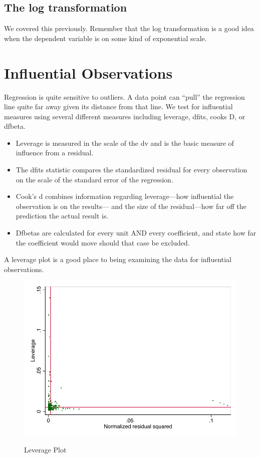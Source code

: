 \documentclass[12pt]{article}
\begin{document}
\subsection{The log transformation}
\label{sec:log-transformation}

We covered this previously. Remember that the log transformation is a
good idea when the dependent variable is on some kind of exponential
scale. 

\section{Influential Observations}
\label{sec:infl-observ}

Regression is quite sensitive to outliers. A data point can ``pull''
the regression line quite far away given its distance from that
line. We test for influential measures using several different
measures including 
leverage, dfits, cooks D, or dfbeta.

\begin{itemize}
\item Leverage is measured in the scale of the dv and is the basic
  measure of influence from a residual.

\item The dfits statistic compares the standardized residual for every
  observation on the scale of the standard error of the regression. 

\item Cook's d combines information regarding leverage---how
  influential the observation is on the results--- and the size of the
  residual---how far off the prediction the actual result is. 

\item Dfbetas are calculated for every unit AND every coefficient, and
  state how far the coefficient would move should that case be
  excluded. 

\end{itemize}

A leverage plot is a good place to being examining the data for
influential observations.

\begin{figure}[ht!]
  \centering
  \caption{Leverage Plot}  
\includegraphics{levplot}
  \label{fig:levplot}
\end{figure}
\end{document}
